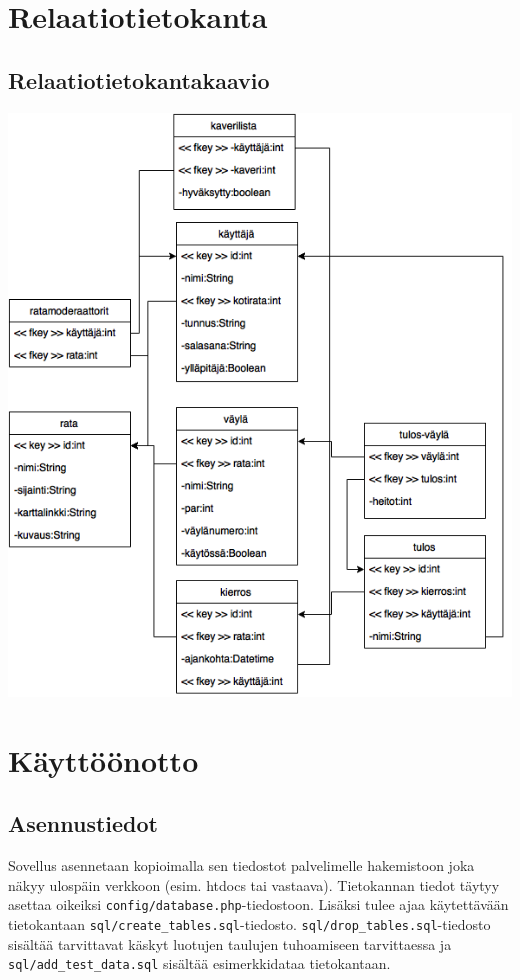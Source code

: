 \documentclass[10pt,a4paper]{article}
\begin{document}
\section{Relaatiotietokanta}
\subsection{Relaatiotietokantakaavio}
\includegraphics[scale=0.6]{tsoha_relaatiotietokantakaavio}
\newpage
\section{Käyttöönotto}
\subsection{Asennustiedot}
Sovellus asennetaan kopioimalla sen tiedostot palvelimelle hakemistoon joka näkyy ulospäin verkkoon (esim. htdocs tai vastaava). 
Tietokannan tiedot täytyy asettaa oikeiksi \texttt{config/database.php}-tiedostoon. 
Lisäksi tulee ajaa käytettävään tietokantaan \texttt{sql/create\_tables.sql}-tiedosto.
\texttt{sql/drop\_tables.sql}-tiedosto sisältää tarvittavat käskyt luotujen taulujen tuhoamiseen tarvittaessa ja \texttt{sql/add\_test\_data.sql} sisältää esimerkkidataa tietokantaan. 
\end{document}
